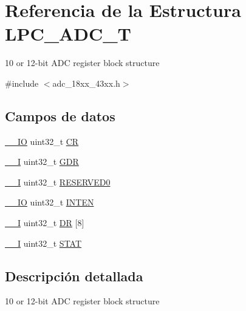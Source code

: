 \hypertarget{struct_l_p_c___a_d_c___t}{}\section{Referencia de la Estructura L\+P\+C\+\_\+\+A\+D\+C\+\_\+T}
\label{struct_l_p_c___a_d_c___t}


10 or 12-\/bit A\+DC register block structure  




{\ttfamily \#include $<$adc\+\_\+18xx\+\_\+43xx.\+h$>$}

\subsection*{Campos de datos}
\begin{DoxyCompactItemize}
\item 
\hyperlink{core__sc300_8h_aec43007d9998a0a0e01faede4133d6be}{\+\_\+\+\_\+\+IO} uint32\+\_\+t \hyperlink{struct_l_p_c___a_d_c___t_ab40c89c59391aaa9d9a8ec011dd0907a}{CR}
\item 
\hyperlink{core__sc300_8h_af63697ed9952cc71e1225efe205f6cd3}{\+\_\+\+\_\+I} uint32\+\_\+t \hyperlink{struct_l_p_c___a_d_c___t_a2272ff4c98c72be44cbb1f47f4bc3100}{G\+DR}
\item 
\hyperlink{core__sc300_8h_af63697ed9952cc71e1225efe205f6cd3}{\+\_\+\+\_\+I} uint32\+\_\+t \hyperlink{struct_l_p_c___a_d_c___t_ad06839c5382047f4f9f2c74cc61db942}{R\+E\+S\+E\+R\+V\+E\+D0}
\item 
\hyperlink{core__sc300_8h_aec43007d9998a0a0e01faede4133d6be}{\+\_\+\+\_\+\+IO} uint32\+\_\+t \hyperlink{struct_l_p_c___a_d_c___t_aca95f89751aed277ff796aab260401f6}{I\+N\+T\+EN}
\item 
\hyperlink{core__sc300_8h_af63697ed9952cc71e1225efe205f6cd3}{\+\_\+\+\_\+I} uint32\+\_\+t \hyperlink{struct_l_p_c___a_d_c___t_a4d79054afddcdbbfa9f690e452269d4e}{DR} \mbox{[}8\mbox{]}
\item 
\hyperlink{core__sc300_8h_af63697ed9952cc71e1225efe205f6cd3}{\+\_\+\+\_\+I} uint32\+\_\+t \hyperlink{struct_l_p_c___a_d_c___t_a9d37b00631f37ab3e4a127a7fee46da7}{S\+T\+AT}
\end{DoxyCompactItemize}


\subsection{Descripción detallada}
10 or 12-\/bit A\+DC register block structure 

